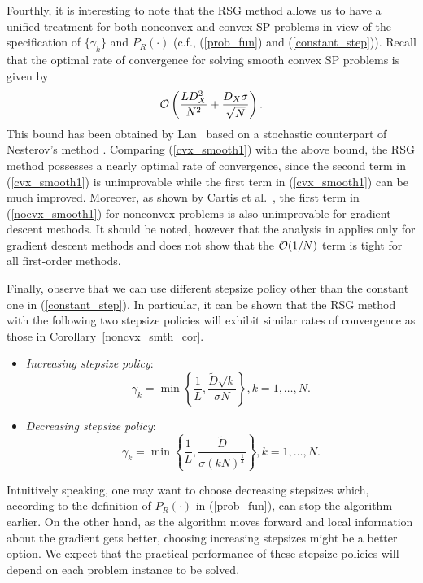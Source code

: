 \documentclass[final]{siamltex}
\def\eqnok#1{(\ref{#1})}
\begin{document}
Fourthly, it is interesting to note that the RSG method allows us to have
a unified treatment for both nonconvex and convex SP problems in view of the
specification of $\{\gamma_k\}$ and $P_R(\cdot)$ (c.f., \eqnok{prob_fun}
and \eqnok{constant_step}). Recall that
the optimal rate of convergence for solving smooth convex SP problems is given by
\[
{\cal O} \left(\frac{L D_X^2}{N^2}+\frac{D_X \sigma}{\sqrt N} \right).
\]
This bound has been obtained by Lan~\cite{Lan10-3} based on a stochastic
counterpart of Nesterov's method \cite{Nest83-1,Nest04}.
Comparing \eqnok{cvx_smooth1} with the above bound,
the RSG method possesses a nearly optimal rate of convergence, since the second term in \eqnok{cvx_smooth1}
is unimprovable while the first term in \eqnok{cvx_smooth1} can be much improved.
Moreover, as shown by Cartis et al.~\cite{CarGouToi12},
the first term in \eqnok{nocvx_smooth1} for nonconvex problems is also
unimprovable for gradient descent methods.
It should be noted, however that the analysis in \cite{CarGouToi12}
applies only for gradient descent methods and  
does not show that the ${\cal O} (1/N)$ term is tight for all first-order
methods.

Finally, observe that we can use different stepsize policy other than the constant one in \eqnok{constant_step}.
In particular, it can be shown that the RSG method with the following two stepsize policies will
exhibit similar rates of convergence as those in Corollary~\ref{noncvx_smth_cor}.
\begin{itemize}
\item {\sl Increasing stepsize policy}: %
\[
\gamma_k = \min \left\{ \frac{1}{L}, \frac{\tilde D \sqrt{k}}{\sigma N}\right\}, k = 1, \ldots, N.
\]

\item {\sl Decreasing stepsize policy}: %
\[
\gamma_k = \min \left\{ \frac{1}{L}, \frac{\tilde D }{\sigma (kN)^{\frac{1}{4}}}\right\}, k = 1, \ldots, N.
\]
\end{itemize}
Intuitively speaking, one may want to choose decreasing stepsizes which, according to the definition of $P_R(\cdot)$ in \eqnok{prob_fun},
can stop the algorithm earlier. On the other hand, as the algorithm moves forward and local information about the gradient gets better,
choosing increasing stepsizes might be a better option. We expect that the practical performance of these stepsize policies will
depend on each problem instance to be solved.
\end{document}
